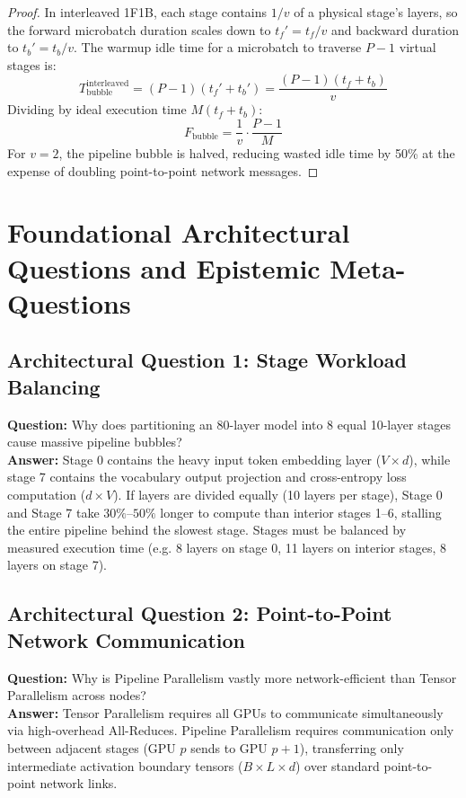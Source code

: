 \documentclass[11pt,a4paper]{article}
\theoremstyle{definition}
\begin{document}
\begin{proof}
In interleaved 1F1B, each stage contains $1/v$ of a physical stage's layers, so the forward microbatch duration scales down to $t_f' = t_f / v$ and backward duration to $t_b' = t_b / v$.
The warmup idle time for a microbatch to traverse $P - 1$ virtual stages is:
{\boldmath
\begin{equation}
T_{\text{bubble}}^{\text{interleaved}} = (P - 1) (t_f' + t_b') = \frac{(P - 1)(t_f + t_b)}{v}
\end{equation}
}
Dividing by ideal execution time $M(t_f + t_b)$:
{\boldmath
\begin{equation}
F_{\text{bubble}} = \frac{1}{v} \cdot \frac{P - 1}{M}
\end{equation}
}
For $v = 2$, the pipeline bubble is halved, reducing wasted idle time by 50\% at the expense of doubling point-to-point network messages.
\end{proof}

\section{Foundational Architectural Questions and Epistemic Meta-Questions}

\subsection{Architectural Question 1: Stage Workload Balancing}
\textbf{Question:} Why does partitioning an 80-layer model into 8 equal 10-layer stages cause massive pipeline bubbles?\\
\textbf{Answer:} Stage 0 contains the heavy input token embedding layer ($V \times d$), while stage 7 contains the vocabulary output projection and cross-entropy loss computation ($d \times V$). If layers are divided equally (10 layers per stage), Stage 0 and Stage 7 take $30\%\text{--}50\%$ longer to compute than interior stages 1–6, stalling the entire pipeline behind the slowest stage. Stages must be balanced by measured execution time (e.g. 8 layers on stage 0, 11 layers on interior stages, 8 layers on stage 7).

\subsection{Architectural Question 2: Point-to-Point Network Communication}
\textbf{Question:} Why is Pipeline Parallelism vastly more network-efficient than Tensor Parallelism across nodes?\\
\textbf{Answer:} Tensor Parallelism requires all GPUs to communicate simultaneously via high-overhead All-Reduces. Pipeline Parallelism requires communication only between adjacent stages (GPU $p$ sends to GPU $p+1$), transferring only intermediate activation boundary tensors ($B \times L \times d$) over standard point-to-point network links.
\end{document}
